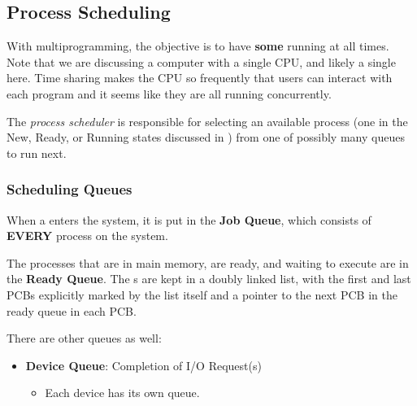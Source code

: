 \subsection{Process Scheduling}\label{subsec:Process_Scheduling}
With multiprogramming, the objective is to have \textbf{some}  running at all times.
Note that we are discussing a computer with a single CPU, and likely a single  here.
Time sharing makes the CPU  so frequently that users can interact with each program and it seems like they are all running concurrently.

\begin{definition}\label{def:Process_Scheduler}
  The \emph{process scheduler} is responsible for selecting an available process (one in the New, Ready, or Running states discussed in ) from one of possibly many queues to run next.
\end{definition}

\subsubsection{Scheduling Queues}\label{subsubsec:Scheduling_Queues}
When a  enters the system, it is put in the \textbf{Job Queue}, which consists of \textbf{EVERY} process on the system.

The processes that are in main memory, are ready, and waiting to execute are in the \textbf{Ready Queue}.
The s are kept in a doubly linked list, with the first and last PCBs explicitly marked by the list itself and a pointer to the next PCB in the ready queue in each PCB.\@

There are other queues as well:
\begin{itemize}[noitemsep]
\item \textbf{Device Queue}: Completion of I/O Request(s)
  \begin{itemize}[noitemsep]
  \item Each device has its own queue.
  \end{itemize}
\end{itemize}

